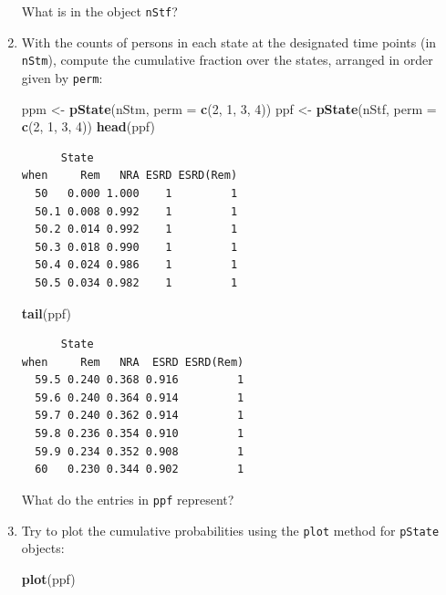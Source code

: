 \documentclass[
]{book}
\newenvironment{Shaded}{\begin{snugshade}}{\end{snugshade}}
\newcommand{\AttributeTok}[1]{\textcolor[rgb]{0.13,0.29,0.53}{#1}}
\newcommand{\DecValTok}[1]{\textcolor[rgb]{0.00,0.00,0.81}{#1}}
\newcommand{\FunctionTok}[1]{\textcolor[rgb]{0.13,0.29,0.53}{\textbf{#1}}}
\newcommand{\NormalTok}[1]{#1}
\newcommand{\OtherTok}[1]{\textcolor[rgb]{0.56,0.35,0.01}{#1}}
\begin{document}
\begin{enumerate}
  What is in the object \texttt{nStf}?
\item
  With the counts of persons in each state at the
  designated time points (in \texttt{nStm}), compute the cumulative
  fraction over the states, arranged in order given by \texttt{perm}:

\begin{Shaded}
\begin{Highlighting}[]
\NormalTok{ppm }\OtherTok{\textless{}{-}} \FunctionTok{pState}\NormalTok{(nStm, }\AttributeTok{perm =} \FunctionTok{c}\NormalTok{(}\DecValTok{2}\NormalTok{, }\DecValTok{1}\NormalTok{, }\DecValTok{3}\NormalTok{, }\DecValTok{4}\NormalTok{))}
\NormalTok{ppf }\OtherTok{\textless{}{-}} \FunctionTok{pState}\NormalTok{(nStf, }\AttributeTok{perm =} \FunctionTok{c}\NormalTok{(}\DecValTok{2}\NormalTok{, }\DecValTok{1}\NormalTok{, }\DecValTok{3}\NormalTok{, }\DecValTok{4}\NormalTok{))}
\FunctionTok{head}\NormalTok{(ppf)}
\end{Highlighting}
\end{Shaded}

\begin{verbatim}
      State
when     Rem   NRA ESRD ESRD(Rem)
  50   0.000 1.000    1         1
  50.1 0.008 0.992    1         1
  50.2 0.014 0.992    1         1
  50.3 0.018 0.990    1         1
  50.4 0.024 0.986    1         1
  50.5 0.034 0.982    1         1
\end{verbatim}

\begin{Shaded}
\begin{Highlighting}[]
\FunctionTok{tail}\NormalTok{(ppf)}
\end{Highlighting}
\end{Shaded}

\begin{verbatim}
      State
when     Rem   NRA  ESRD ESRD(Rem)
  59.5 0.240 0.368 0.916         1
  59.6 0.240 0.364 0.914         1
  59.7 0.240 0.362 0.914         1
  59.8 0.236 0.354 0.910         1
  59.9 0.234 0.352 0.908         1
  60   0.230 0.344 0.902         1
\end{verbatim}

  What do the entries in \texttt{ppf} represent?
\item
  Try to plot the cumulative probabilities using the \texttt{plot} method
  for \texttt{pState} objects:

\begin{Shaded}
\begin{Highlighting}[]
\FunctionTok{plot}\NormalTok{(ppf)}
\end{Highlighting}
\end{Shaded}


\end{enumerate}
\end{document}
